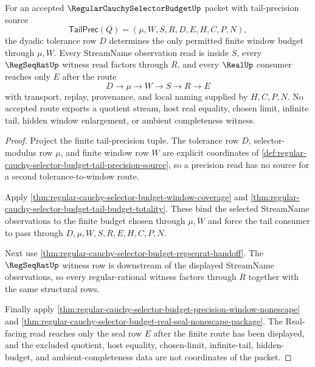 \begin{theorem}
\label{thm:regular-cauchy-selector-budget-tail-precision-exactness}
For an accepted $\RegularCauchySelectorBudgetUp$ packet with tail-precision source
$$
\mathsf{TailPrec}(Q)=(\mu,W,S,R,D,E,H,C,P,N),
$$
the dyadic tolerance row $D$ determines the only permitted finite window budget through $\mu,W$. Every StreamName observation read is inside $S$, every $\RegSeqRatUp$ witness read factors through $R$, and every $\RealUp$ consumer reaches only $E$ after the route
$$
D \longrightarrow \mu \longrightarrow W \longrightarrow S \longrightarrow R \longrightarrow E
$$
with transport, replay, provenance, and local naming supplied by $H,C,P,N$. No accepted route exports a quotient stream, host real equality, chosen limit, infinite tail, hidden window enlargement, or ambient completeness witness.
\end{theorem}
\begin{proof}
Project the finite tail-precision tuple. The tolerance row $D$, selector-modulus row $\mu$, and finite window row $W$ are explicit coordinates of \autoref{def:regular-cauchy-selector-budget-tail-precision-source}, so a precision read has no source for a second tolerance-to-window route.

Apply \autoref{thm:regular-cauchy-selector-budget-window-coverage} and \autoref{thm:regular-cauchy-selector-budget-tail-budget-totality}. These bind the selected StreamName observations to the finite budget chosen through $\mu,W$ and force the tail consumer to pass through $D,\mu,W,S,R,E,H,C,P,N$.

Next use \autoref{thm:regular-cauchy-selector-budget-regseqrat-handoff}. The $\RegSeqRatUp$ witness row is downstream of the displayed StreamName observations, so every regular-rational witness factors through $R$ together with the same structural rows.

Finally apply \autoref{thm:regular-cauchy-selector-budget-precision-window-nonescape} and \autoref{thm:regular-cauchy-selector-budget-real-seal-nonescape-package}. The Real-facing read reaches only the seal row $E$ after the finite route has been displayed, and the excluded quotient, host equality, chosen-limit, infinite-tail, hidden-budget, and ambient-completeness data are not coordinates of the packet.
\end{proof}

